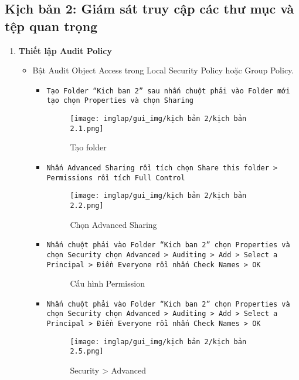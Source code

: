 \documentclass[13pt]{article}
\begin{document}
\subsection{Kịch bản 2: Giám sát truy cập các thư mục và tệp quan trọng}
        \begin{enumerate}
            \item \textbf{Thiết lập Audit Policy}
            \begin{itemize}
                \item Bật Audit Object Access trong Local Security Policy hoặc Group Policy.
                \sloppy
                \begin{itemize}
                    \item \texttt{Tạo Folder “Kich ban 2” sau nhấn chuột phải vào Folder mới tạo chọn Properties và chọn Sharing }
                    \begin{figure}[H]
                        \centering
                        \texttt{[image: imglap/gui\_img/kịch bản 2/kịch bản 2.1.png]}
                        \caption{Tạo folder}
                        \label{fig:enter-label}
                    \end{figure}
                

\newpage
                \item \texttt{Nhấn Advanced Sharing rồi tích chọn Share this folder > Permissions rồi tích Full Control}
                \begin{figure}[H]
                    \centering
                    \texttt{[image: imglap/gui\_img/kịch bản 2/kịch bản 2.2.png]}
                    \caption{Chọn Advanced Sharing}
                    \label{fig:enter-label}
                \end{figure}
\newpage
                \item \texttt{Nhấn chuột phải vào Folder “Kich ban 2”  chọn Properties và chọn Security chọn Advanced > 
Auditing > Add > Select a Principal > Điền Everyone rồi nhấn Check Names > OK}
                \begin{figure}[H]
 		\hfill
 		\hfill
 				\caption{Cấu hình Permission}
 				\label{fig:AD_p2}
 		\end{figure}

            \item \texttt{Nhấn chuột phải vào Folder “Kich ban 2”  chọn Properties và chọn Security chọn Advanced > 
Auditing > Add > Select a Principal > Điền Everyone rồi nhấn Check Names > OK}
            \begin{figure}[H]
                \centering
                \texttt{[image: imglap/gui\_img/kịch bản 2/kịch bản 2.5.png]}
                \caption{Security > Advanced}
                \label{fig:enter-label}
            \end{figure}


\end{itemize}
\end{itemize}
\end{enumerate}
\end{document}
